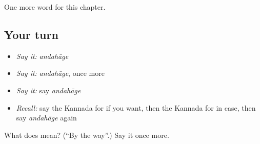\begin{grammarlens}[title={What you've built}]
One more word for this chapter.
\end{grammarlens}

\subsection*{Your turn}
\begin{itemize}
\raggedright
  \item \emph{Say it:} \emph{andahāge}
  \item \emph{Say it:} \emph{andahāge}, once more
  \item \emph{Say it:} say \emph{andahāge}
  \item \emph{Recall:} say the Kannada for if you want, then the Kannada for in case, then say \emph{andahāge} again
\end{itemize}

\begin{tcolorbox}[breakable,colback=teal!4,colframe=teal!35!black,title={Before you move on}]
What does  mean? (\textquotedblleft{}By the way\textquotedblright{}.) Say it once more.
\end{tcolorbox}
